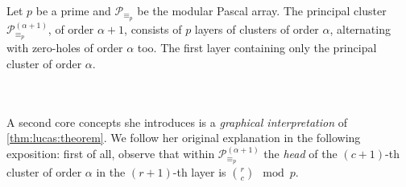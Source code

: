 \begin{theorem}
    Let $p$ be a prime and $\mathcal{P}_{\equiv_{p}}$ be the 
    modular Pascal array. The principal cluster $\mathcal{P}_{\equiv_{p}}^{(\alpha+1)}$,
    of order $\alpha + 1$, consists of $p$ layers of clusters of order $\alpha$, alternating
    with zero-holes of order $\alpha$ too. The first layer containing only the principal
    cluster of order $\alpha$.
\end{theorem}
\quad
\\\\
A second core concepts she introduces is a \emph{graphical interpretation} of
\autoref{thm:lucas:theorem}. We follow her original explanation in the
following exposition: first of all, observe that within
$\mathcal{P}_{\equiv_{p}}^{(\alpha+1)}$ the \emph{head} of the $(c+1)$-th cluster
of order $\alpha$ in the $(r+1)$-th layer is ${{r}\choose{c}}\mod p$.

